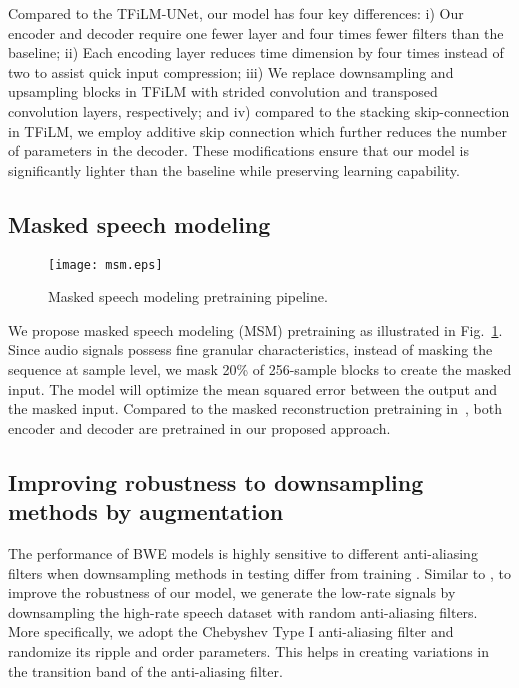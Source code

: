 \documentclass{article}
\begin{document}
Compared to the TFiLM-UNet, our model has four key differences: i) Our encoder and decoder require one fewer layer and four times fewer filters than the baseline; ii) Each encoding layer reduces time dimension by four times instead of two to assist quick input compression; iii) We replace downsampling and upsampling blocks in TFiLM with strided convolution and transposed convolution layers, respectively; and iv) compared to the stacking skip-connection in TFiLM, we employ additive skip connection which further reduces the number of parameters in the decoder. These modifications ensure that our model is significantly lighter than the baseline while preserving learning capability.\vspace{-0.1cm}

\vspace{-0.2cm}
\subsection{Masked speech modeling}
\label{sec:msm}
\begin{figure}
    \centering
    \texttt{[image: msm.eps]}
    \caption{Masked speech modeling pretraining pipeline.}
    \label{fig:msm}
\end{figure}
We propose masked speech modeling (MSM) pretraining as illustrated in Fig.~\ref{fig:msm}. Since audio signals possess fine granular characteristics, instead of masking the sequence at sample level, we mask 20\% of 256-sample blocks to create the masked input. The model will optimize the mean squared error between the output and the masked input. Compared to the masked reconstruction pretraining in~\cite{wang2020unsupervised}, both encoder and decoder are pretrained in our proposed approach.
\vspace{-0.2cm}

\subsection{Improving robustness to downsampling methods by augmentation}
\label{sec:mfd}
The performance of BWE models is highly sensitive to different anti-aliasing filters when downsampling methods in testing differ from training \cite{waveunet, birnbaum2021temporal, Sulun_2021}. Similar to \cite{Sulun_2021}, to improve the robustness of our model, we generate the low-rate signals by downsampling the high-rate speech dataset with random anti-aliasing filters. More specifically, we adopt the Chebyshev Type I anti-aliasing filter and randomize its ripple and order parameters. This helps in creating variations in the transition band of the anti-aliasing filter.\vspace{-0.1cm}
\end{document}
